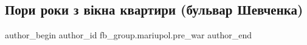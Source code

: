  
 
 
 
 

\subsection{Пори роки з вікна квартири (бульвар Шевченка)}
\label{sec:09_02_2023.fb.fb_group.mariupol.pre_war.4.pori_roki_z_v_kna_kv}

\ifcmt
 author_begin
   author_id fb_group.mariupol.pre_war
 author_end
\fi
